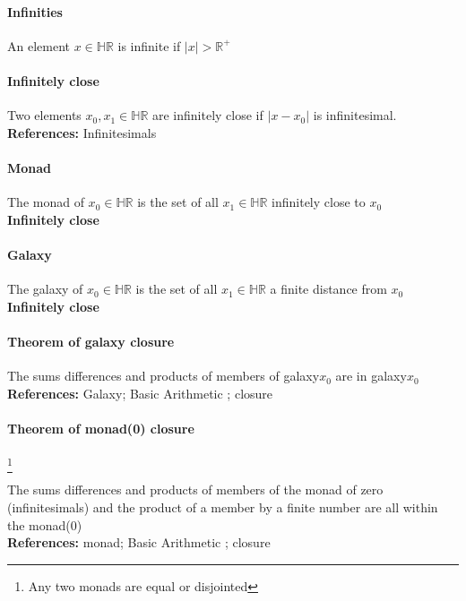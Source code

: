 \documentclass[12pt, a4paper,oneside]{book}
\begin{document}
\paragraph{Infinities}
\begin{paragraph}
An element \( x \in \mathbb{HR}\) is infinite if \(\vert x \vert > \mathbb{R^+}\)
\end{paragraph}
\paragraph{Infinitely close}
\begin{paragraph}
Two elements \(x_0,x_1 \in \mathbb{HR}\) are infinitely close if \(\vert x-x_0 \vert\) is infinitesimal.\\
\textbf{References:} Infinitesimals 
\end{paragraph}
\paragraph{Monad}
\begin{paragraph}
The monad of \(x_0 \in \mathbb{HR}\) is the set of all \(x_1 \in \mathbb{HR}\) infinitely close to \(x_0\)\\
\textbf{Infinitely close}
\end{paragraph}
\paragraph{Galaxy}
\begin{paragraph}
The galaxy of \(x_0 \in \mathbb{HR}\) is the set of all \(x_1 \in \mathbb{HR}\) a finite distance from \(x_0\)\\
\textbf{Infinitely close}
\end{paragraph}
\paragraph{Theorem of galaxy closure}
\begin{paragraph}
The sums differences and products of members of galaxy\(x_0\) are in galaxy\(x_0\)\\
\textbf{References:} Galaxy; Basic Arithmetic ; closure
\end{paragraph}
\paragraph{Theorem of monad(0) closure}  \footnote{Any two monads are equal or disjointed}
\begin{paragraph}
The sums differences and products of members of the monad of zero (infinitesimals) and the product of a member by a finite number are all within the monad(0)\\
\textbf{References:} monad; Basic Arithmetic ; closure
\end{paragraph}
\end{document}
